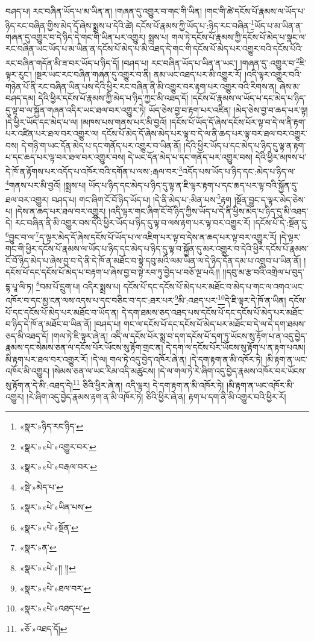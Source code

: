 བཤད་པ། རང་བཞིན་ཡོད་པ་མ་ཡིན་ན། །གཞན་དུ་འགྱུར་བ་གང་གི་ཡིན། །གང་གི་ཚེ་དངོས་པོ་རྣམས་ལ་ཡོད་པ་ཉིད་རང་བཞིན་གྱིས་མེད་དོ་ཞེས་སྨྲས་པ་དེའི་ཚེ། དངོས་པོ་རྣམས་ཀྱི་ཡོད་པ་:ཉིད་རང་བཞིན་\footnote{«སྣར་»ཉིད་རང་ཉིད་}ཡོད་པ་མ་ཡིན་ན་གཞན་དུ་འགྱུར་བ་དེ་ཉིད་དེ་གང་གི་ཡིན་པར་འགྱུར། སྨྲས་པ། གལ་ཏེ་དངོས་པོ་རྣམས་ཀྱི་དངོས་པོ་མེད་པ་སྣང་ལ་རང་བཞིན་ཡང་ཡོད་པ་མ་ཡིན་ན་དངོས་པོ་མེད་པ་མི་འཐད་དེ་གང་གི་དངོས་པོ་མེད་པར་འགྱུར་བའི་དངོས་པོའི་རང་བཞིན་གདོན་མི་ཟ་བར་ཡོད་པ་ཉིད་དོ། །བཤད་པ། རང་བཞིན་ཡོད་པ་ཡིན་ན་ཡང་། །གཞན་དུ་:འགྱུར་བ་\footnote{«སྣར་»«པེ་»འགྱུར་བར་}ཇི་ལྟར་རུང་། །སྔར་ཡང་རང་བཞིན་གཞན་དུ་འགྱུར་བ་ནི། ནམ་ཡང་འཐད་པར་མི་འགྱུར་རོ། །འདི་ལྟར་འགྱུར་བའི་གཉེན་པོ་ནི་རང་བཞིན་ཡིན་པས་དེའི་ཕྱིར་རང་བཞིན་ནི་མི་འགྱུར་བར་རྟག་པར་འགྱུར་བའི་རིགས་ན། ཞེས་མ་བཤད་དམ། དེའི་ཕྱིར་དངོས་པོ་རྣམས་ཀྱི་མེད་པ་ཉིད་ཀྱང་མི་འཐད་དོ། །དངོས་པོ་རྣམས་ལ་ཡོད་པ་དང་མེད་པ་ཉིད་དུ་ལྟ་བ་ལ་སྐྱོན་གཞན་འདིར་ཡང་ཐལ་བར་འགྱུར་ཏེ། ཡོད་ཅེས་བྱ་བ་རྟག་པར་འཛིན། །མེད་ཅེས་བྱ་བ་ཆད་པར་ལྟ། །དེ་ཕྱིར་ཡོད་དང་མེད་པ་ལ། །མཁས་པས་གནས་པར་མི་བྱའོ། །དངོས་པོ་ཡོད་དོ་ཞེས་དངོས་པོར་ལྟ་བ་དེ་ལ་ནི་རྟག་པར་འཛིན་པར་ཐལ་བར་འགྱུར་ལ། དངོས་པོ་མེད་དོ་ཞེས་མེད་པར་ལྟ་བ་དེ་ལ་ནི་ཆད་པར་ལྟ་བར་ཐལ་བར་འགྱུར་བས། དེ་གཉི་ག་ཡང་དོན་མེད་པ་དང་གནོད་པར་འགྱུར་བ་ཡིན་ནོ། །དེའི་ཕྱིར་ཡོད་པ་དང་མེད་པ་ཉིད་དུ་ལྟ་ན་རྟག་པ་དང་ཆད་པར་ལྟ་བར་ཐལ་བར་འགྱུར་བས། དེ་ཡང་དོན་མེད་པ་དང་གནོད་པར་འགྱུར་བས། དེའི་ཕྱིར་མཁས་པ་དེ་ཁོ་ན་རྟོགས་པར་འདོད་པ་འཁོར་བའི་དགོན་པ་ལས་:རྒལ་བར་\footnote{«སྣར་»«པེ་»བརྒལ་བར་}འདོད་པས་ཡོད་པ་ཉིད་དང་:མེད་པ་ཉིད་ལ་\footnote{«སྡེ་»མེད་པ་}གནས་པར་མི་བྱའོ། །སྨྲས་པ། ཡོད་པ་ཉིད་དང་མེད་པ་ཉིད་དུ་ལྟ་ན་ཇི་ལྟར་རྟག་པ་དང་ཆད་པར་ལྟ་བའི་སྐྱོན་དུ་ཐལ་བར་འགྱུར། བཤད་པ། གང་ཞིག་ངོ་བོ་ཉིད་ཡོད་པ། །དེ་ནི་མེད་པ་:མིན་པས་\footnote{«སྣར་»«པེ་»ཡིན་པས་}རྟག །སྔོན་བྱུང་ད་ལྟར་མེད་ཅེས་པ། །དེས་ན་ཆད་པར་ཐལ་བར་འགྱུར། །འདི་ལྟར་གང་ཞིག་ངོ་བོ་ཉིད་ཀྱིས་ཡོད་པ་དེ་ནི་ཕྱིས་མེད་པ་ཉིད་དུ་མི་འཐད་དེ། རང་བཞིན་ནི་མི་འགྱུར་བས་དེའི་ཕྱིར་ཡོད་པ་ཉིད་དུ་ལྟ་བ་ལས་རྟག་པར་ལྟ་བར་འགྱུར་རོ། །དངོས་པོ་དེ་:སྔོན་དུ་\footnote{«སྣར་»«པེ་»སྔོན་}བྱུང་བ་ལ་\footnote{«སྣར་»ན་}ད་ལྟར་མེད་དོ་ཞེས་དངོས་པོ་ཡོད་པ་ལ་འཇིག་པར་ལྟ་བ་དེས་ན་ཆད་པར་ལྟ་བར་འགྱུར་རོ། །དེ་ལྟར་གང་གི་ཕྱིར་དངོས་པོ་རྣམས་ལ་ཡོད་པ་ཉིད་དང་མེད་པ་ཉིད་དུ་ལྟ་བ་སྐྱོན་དུ་མར་འགྱུར་བ་དེའི་ཕྱིར་དངོས་པོ་རྣམས་ངོ་བོ་ཉིད་མེད་པ་ཞེས་བྱ་བ་དེ་ནི་དེ་ཁོ་ན་མཐོང་བ་སྟེ་དབུ་མའི་ལམ་ཡིན་ལ་དེ་ཉིད་དོན་དམ་པ་འགྲུབ་པ་ཡིན་ནོ། །དངོས་པོ་དང་དངོས་པོ་མེད་པ་བརྟག་པ་ཞེས་བྱ་བ་སྟེ་རབ་ཏུ་བྱེད་པ་བཅོ་ལྔ་པའོ:།། །།དབུ་མ་རྩ་བའི་འགྲེལ་པ་བུད་དྷ་པཱ་ལི་ཏ། \footnote{«སྣར་»«པེ་»།། །། }བམ་པོ་དྲུག་པ། འདིར་སྨྲས་པ། དངོས་པོ་དང་དངོས་པོ་མེད་པར་མཐོང་བ་མེད་པ་གང་ལ་འགའ་ཡང་འཁོར་བ་དང་མྱ་ངན་ལས་འདས་པ་དང་བཅིང་བ་དང་:ཐར་པར་\footnote{«སྣར་»«པེ་»ཐལ་བར་}མི་:འཐད་པར་\footnote{«སྣར་»«པེ་»འཐད་པ་}དེ་ཇི་ལྟར་དེ་ཁོ་ན་ཡིན། དངོས་པོ་དང་དངོས་པོ་མེད་པར་མཐོང་བ་ཡོད་ན། དེ་དག་ཐམས་ཅད་འཐད་པས་དངོས་པོ་དང་དངོས་པོ་མེད་པར་མཐོང་བ་ཉིད་དེ་ཁོ་ན་མཐོང་བ་ཡིན་ནོ། །བཤད་པ། གང་ལ་དངོས་པོ་དང་དངོས་པོ་མེད་པར་མཐོང་བ་དེ་ལ་དེ་དག་ཐམས་ཅད་མི་འཐད་དོ། །གལ་ཏེ་ཇི་ལྟར་ཞེ་ན། འདི་ལ་དངོས་པོར་སྨྲ་བ་དག་དངོས་པོ་དག་ཏུ་ཡོངས་སུ་རྟོག་པ་ན་འདུ་བྱེད་རྣམས་དང་སེམས་ཅན་ལ་དངོས་པོར་ཡོངས་སུ་རྟོག་གྲང་ན། དེ་དག་ལ་དངོས་པོར་ཡོངས་སུ་རྟོག་པ་ན་རྟག་པའམ། མི་རྟག་པར་ཐལ་བར་འགྱུར་རོ། །དེ་ལ། གལ་ཏེ་འདུ་བྱེད་འཁོར་ཞེ་ན། །དེ་དག་རྟག་ན་མི་འཁོར་ཏེ། །མི་རྟག་ན་ཡང་འཁོར་མི་འགྱུར། །སེམས་ཅན་ལ་ཡང་རིམ་འདི་མཚུངས། །དེ་ལ་གལ་ཏེ་རེ་ཞིག་འདུ་བྱེད་རྣམས་འཁོར་བར་ཡོངས་སུ་རྟོག་ན་དེ་མི་:འཐད་དེ།\footnote{«ཅོ་»འཐད་དོ།} ཅིའི་ཕྱིར་ཞེ་ན། འདི་ལྟར། དེ་དག་རྟག་ན་མི་འཁོར་ཏེ། །མི་རྟག་ན་ཡང་འཁོར་མི་འགྱུར། །རེ་ཞིག་འདུ་བྱེད་རྣམས་རྟག་ན་མི་འཁོར་ཏེ། ཅིའི་ཕྱིར་ཞེ་ན། རྟག་པ་དག་ནི་མི་འགྱུར་བའི་ཕྱིར་རོ། 